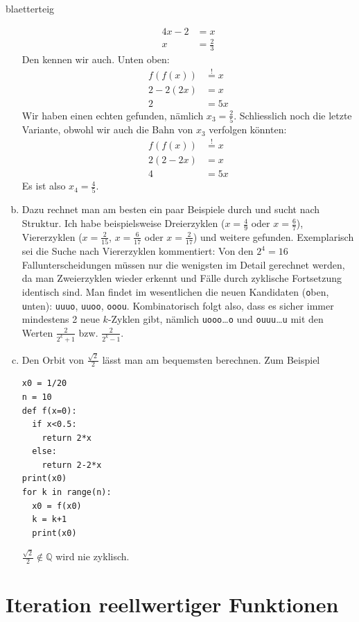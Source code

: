 \documentclass[%
<<<<<<< Updated upstream
<<<<<<< Updated upstream
11pt,%
twoside,%
titlepage,%
german,%
headsepline%
]{scrartcl}
\begin{document}
\begin{lsg}{blaetterteig}
\begin{enumerate}[a)]
\begin{align*}
4x-2 &= x\\
x &= \frac{2}{3}
\end{align*}
Den kennen wir auch. Unten oben:
\begin{align*}
f(f(x)) &\stackrel{!}{=} x\\
2-2(2x) &= x\\
2 &= 5x
\end{align*}
Wir haben einen echten gefunden, n\"amlich $x_{3}=\frac{2}{5}$. Schliesslich noch die letzte Variante, obwohl wir auch die Bahn von $x_{3}$ verfolgen k\"onnten:
\begin{align*}
f(f(x)) &\stackrel{!}{=} x\\
2(2-2x) &= x\\
4 &= 5x
\end{align*}
Es ist also $x_{4}=\frac{4}{5}$.
\item Dazu rechnet man am besten ein paar Beispiele durch und sucht nach Struktur. Ich habe beispielsweise Dreierzyklen ($x=\frac{4}{9}$ oder $x=\frac{6}{7}$), Viererzyklen ($x=\frac{2}{15}$, $x=\frac{6}{17}$ oder $x=\frac{2}{17}$) und weitere gefunden. Exemplarisch sei die Suche nach Viererzyklen kommentiert: Von den $2^{4}=16$ Fallunterscheidungen m\"ussen nur die wenigsten im Detail gerechnet werden, da man Zweierzyklen wieder erkennt und F\"alle durch zyklische Fortsetzung identisch sind. Man findet im wesentlichen die neuen Kandidaten (\texttt{o}ben, \texttt{u}nten): \texttt{uuuo}, \texttt{uuoo}, \texttt{ooou}. Kombinatorisch folgt also, dass es sicher immer mindestens 2 neue $k$-Zyklen gibt, n\"amlich \texttt{uooo}\dots\texttt{o} und \texttt{ouuu}\dots\texttt{u} mit den Werten $\frac{2}{2^{k}+1}$ bzw. $\frac{2}{2^{k}-1}$.
\item Den Orbit von $\frac{\sqrt{2}}{2}$ l\"asst man am bequemsten berechnen. Zum Beispiel
\begin{lstlisting}
x0 = 1/20
n = 10
def f(x=0):
  if x<0.5:
    return 2*x
  else:
    return 2-2*x
print(x0)
for k in range(n):
  x0 = f(x0)
  k = k+1
  print(x0)
\end{lstlisting}
$\frac{\sqrt{2}}{2}\not\in\mathbb{Q}$ wird nie zyklisch.
\end{enumerate}
\end{lsg}

\clearpage

\section{Iteration reellwertiger Funktionen}
\end{document}
